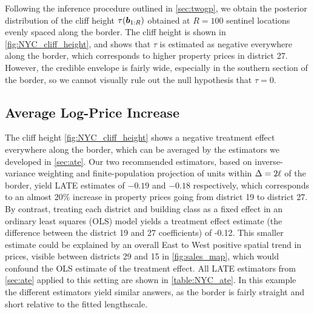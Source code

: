 Following the inference procedure outlined in \autoref{sec:twogp}, we obtain the posterior distribution of the cliff height \(\tau(\bm{b}_{1:R})\) obtained at \(R=100\) sentinel locations evenly spaced along the border.
The cliff height is shown in \autoref{fig:NYC_cliff_height}, and shows that \(\tau\) is estimated as negative everywhere along the border, which corresponds to higher property prices in district 27.
However, the credible envelope is fairly wide, especially in the southern section of the border, so we cannot visually rule out the null hypothesis that \(\tau=0\).

\subsection{Average Log-Price Increase}
The cliff height \autoref{fig:NYC_cliff_height} shows a negative treatment effect everywhere along the border, which can be averaged by the estimators we developed in \autoref{sec:ate}.
Our two recommended estimators, based on inverse-variance weighting and finite-population projection of units within \(\Delta=2\ell\) of the border, yield LATE estimates of \(-0.19\) and \(-0.18\) respectively, which corresponds to an almost 20\% increase in property prices going from district 19 to district 27.
By contrast, treating each district and building class as a fixed effect in an ordinary least squares (OLS) model yields a treatment effect estimate (the difference between the district 19 and 27 coefficients) of -0.12. 
This smaller estimate could be explained by an overall East to West positive spatial trend in prices, visible between districts 29 and 15 in \autoref{fig:sales_map}, which would confound the OLS estimate of the treatment effect.
All LATE estimators from \autoref{sec:ate} applied to this setting are shown in \autoref{table:NYC_ate}.
In this example the different estimators yield similar answers, as the border is fairly straight and short relative to the fitted lengthscale.


